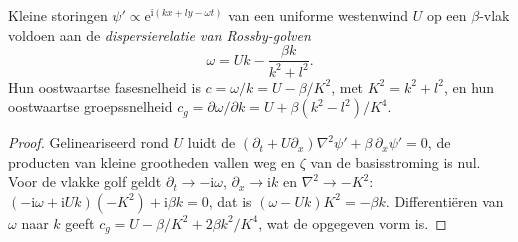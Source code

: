 \begin{theorem}\label{thm:b3:atmospheric-dynamics:rossby}
Kleine storingen $\psi' \propto \mathrm e^{\mathrm i(kx + ly - \omega t)}$
van een uniforme westenwind $U$ op een $\beta$-vlak voldoen aan de
\emph{dispersierelatie van Rossby-golven}
\[
\omega = Uk - \frac{\beta k}{k^2 + l^2} .
\]
Hun oostwaartse fasesnelheid is $c = \omega/k = U - \beta/K^2$, met $K^2 =
k^2 + l^2$, en hun oostwaartse groepssnelheid $c_g = \partial\omega/\partial
k = U + \beta(k^2 - l^2)/K^4$.
\end{theorem}

\begin{proof}
Gelineariseerd rond $U$ luidt de 
$(\partial_t + U\partial_x)\nabla^2\psi' + \beta\,\partial_x\psi' = 0$, de
producten van kleine grootheden vallen weg en $\zeta$ van de basisstroming
is nul. Voor de vlakke golf geldt $\partial_t \to -\mathrm i\omega$,
$\partial_x \to \mathrm ik$ en $\nabla^2 \to -K^2$: $(-\mathrm i\omega +
\mathrm iUk)(-K^2) + \mathrm i\beta k = 0$, dat is $(\omega - Uk)K^2 =
-\beta k$. Differentiëren van $\omega$ naar $k$ geeft $c_g = U -
\beta/K^2 + 2\beta k^2/K^4$, wat de opgegeven vorm is.
\end{proof}

